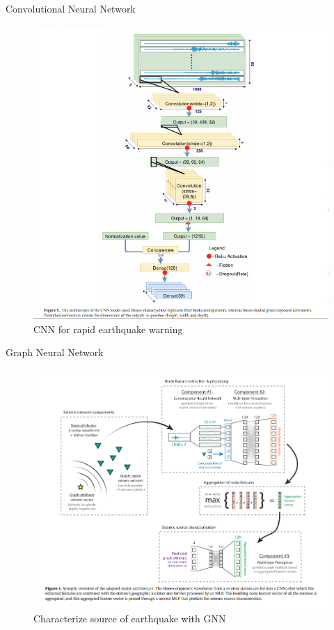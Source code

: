 \documentclass{beamer}
\begin{document}
	
	\begin{frame}[t]{Convolutional Neural Network}
		\begin{figure}
			\includegraphics[scale=0.3]{cnn.png}
			\caption{CNN for rapid earthquake warning}
		\end{figure}
	\end{frame}
	

	
	\begin{frame}[t]{Graph Neural Network}
		\begin{figure}
			\includegraphics[scale=0.3]{gnn.png}
			\caption{Characterize source of earthquake with GNN}
		\end{figure}
	\end{frame}
	
\end{document}

